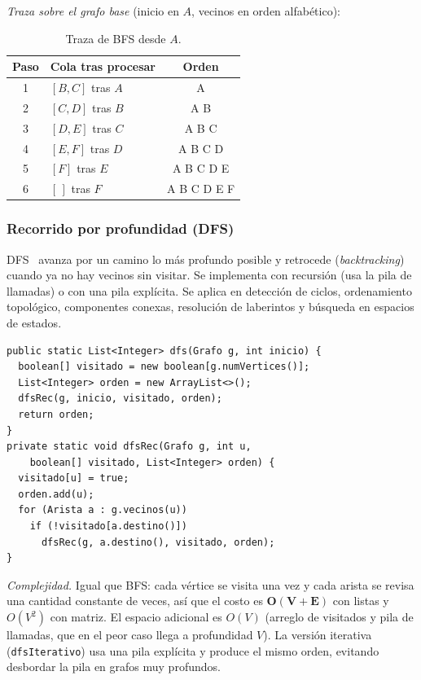 \documentclass[conference]{IEEEtran}
\begin{document}
\emph{Traza sobre el grafo base} (inicio en $A$, vecinos en orden alfabético):

\begin{table}[h]
\caption{Traza de BFS desde $A$.}
\label{tab:bfs}
\centering
\small
\begin{tabular}{clc}
\toprule
\textbf{Paso} & \textbf{Cola tras procesar} & \textbf{Orden} \\
\midrule
1 & $[B,C]$ tras $A$ & A \\
2 & $[C,D]$ tras $B$ & A B \\
3 & $[D,E]$ tras $C$ & A B C \\
4 & $[E,F]$ tras $D$ & A B C D \\
5 & $[F]$ tras $E$ & A B C D E \\
6 & $[\,]$ tras $F$ & A B C D E F \\
\bottomrule
\end{tabular}
\end{table}

\subsubsection{Recorrido por profundidad (DFS)}
DFS~\cite{tarjan,cormen} avanza por un camino lo más profundo posible y retrocede (\emph{backtracking}) cuando ya no hay vecinos sin visitar. Se implementa con recursión (usa la pila de llamadas) o con una pila explícita. Se aplica en detección de ciclos, ordenamiento topológico, componentes conexas, resolución de laberintos y búsqueda en espacios de estados.

\begin{lstlisting}[caption={DFS recursivo (Recorridos.java)}]
public static List<Integer> dfs(Grafo g, int inicio) {
  boolean[] visitado = new boolean[g.numVertices()];
  List<Integer> orden = new ArrayList<>();
  dfsRec(g, inicio, visitado, orden);
  return orden;
}
private static void dfsRec(Grafo g, int u,
    boolean[] visitado, List<Integer> orden) {
  visitado[u] = true;
  orden.add(u);
  for (Arista a : g.vecinos(u))
    if (!visitado[a.destino()])
      dfsRec(g, a.destino(), visitado, orden);
}
\end{lstlisting}

\emph{Complejidad.} Igual que BFS: cada vértice se visita una vez y cada arista se revisa una cantidad constante de veces, así que el costo es $\mathbf{O(V+E)}$ con listas y $O(V^2)$ con matriz. El espacio adicional es $O(V)$ (arreglo de visitados y pila de llamadas, que en el peor caso llega a profundidad $V$). La versión iterativa (\texttt{dfsIterativo}) usa una pila explícita y produce el mismo orden, evitando desbordar la pila en grafos muy profundos.
\end{document}

